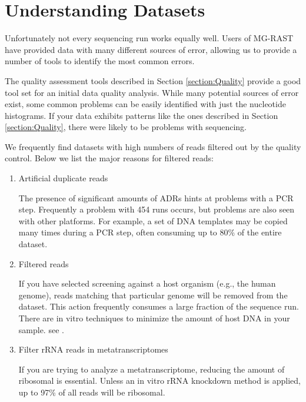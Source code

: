 \documentclass[12pt,fullpage]{report}
\begin{document}
\section{Understanding Datasets}
Unfortunately not every sequencing run works equally well. Users of MG-RAST have provided data with
many different sources of error, allowing us to provide a number of tools to identify the most common errors.

The quality assessment tools described in Section \ref{section:Quality} provide a good tool set for an initial data quality analysis. While many potential sources of error exist, some common problems can be easily identified with just the nucleotide histograms. If your data exhibits patterns like the ones described in Section \ref{section:Quality}, there were likely to be problems with sequencing.

We frequently find datasets with high numbers of reads filtered out by the quality control. Below we list the major reasons for filtered reads:

\begin{enumerate}
\item Artificial duplicate reads 

The presence of significant amounts of ADRs hints at problems with a PCR step. Frequently a problem with 454 runs occurs, but problems are also seen with other platforms. For example, a set of DNA templates may be  copied many times during a PCR step, often consuming up to 80\% of the entire dataset.

\item Filtered reads

If you have selected screening against a host organism (e.g., the human genome), reads matching that particular genome will be removed from the dataset. This action frequently consumes a large fraction of the sequence run. There are in vitro techniques to minimize the amount of host DNA in your sample. see \cite{THOMASREVIEW}.

\item Filter rRNA reads in metatranscriptomes

If you are trying to analyze a metatranscriptome, reducing the amount of ribosomal is essential. Unless an in vitro rRNA knockdown method is applied, up to 97\% of all reads will be ribosomal.
\end{enumerate}
\end{document}
